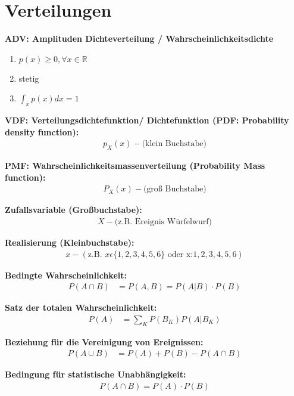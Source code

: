 \section{Verteilungen}

\textbf{ADV: Amplituden Dichteverteilung / Wahrscheinlichkeitsdichte}
\begin{enumerate}
\item $p(x) \geq 0, \forall x \in \mathbb{R}$
\item stetig
\item $\int_{x} p(x) dx = 1$
\end{enumerate}

\textbf{VDF: Verteilungsdichtefunktion/ Dichtefunktion (PDF: Probability density function):}
\begin{align}
p_X(x) - \text{(klein Buchstabe)}
\end{align}

\textbf{PMF: Wahrscheinlichkeitsmassenverteilung (Probability Mass function):}
\begin{align}
P_X(x) - \text{(groß Buchstabe)}
\end{align}

\textbf{Zufallsvariable (Großbuchstabe):}
\begin{align}
X - \text{(z.B. Ereignis Würfelwurf)}
\end{align}

\textbf{Realisierung (Kleinbuchstabe):}
\begin{align}
x - (\text{z.B. } x \epsilon \{1,2,3,4,5,6\} \text{ oder x:} 1,2,3,4,5,6)
\end{align}

\textbf{Bedingte Wahrscheinlichkeit:}
\begin{align}
P(A \cap B) &= P(A,B) = P(A|B) \cdot P(B)
\end{align}

\textbf{Satz der totalen Wahrscheinlichkeit:}
\begin{align}
P(A) &= \sum_K P(B_K)P(A|B_K)
\end{align}

\textbf{Beziehung für die Vereinigung von Ereignissen:}
\begin{align}
P(A \cup B) &= P(A) + P(B) - P(A \cap B)
\end{align}

\textbf{Bedingung für statistische Unabhängigkeit:}
\begin{align}
P(A \cap B) = P(A) \cdot P(B)
\end{align}

